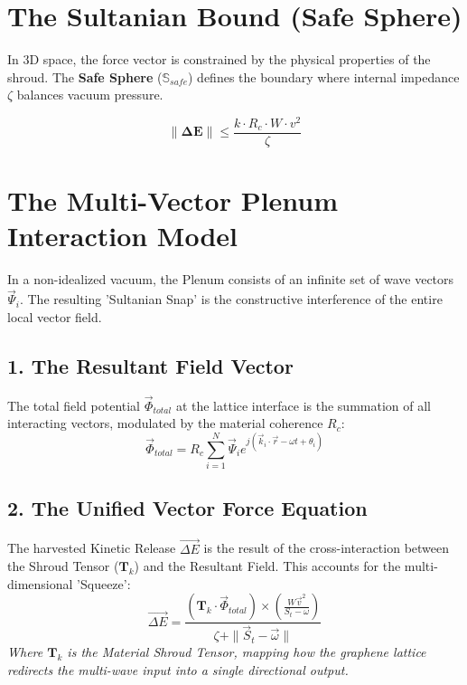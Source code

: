 \documentclass[11pt]{article}
\begin{document}
\section{The Sultanian Bound (Safe Sphere)}
In 3D space, the force vector is constrained by the physical properties of the shroud. The \textbf{Safe Sphere} ($\mathbb{S}_{safe}$) defines the boundary where internal impedance $\zeta$ balances vacuum pressure.

\begin{equation}
    \|\mathbf{\Delta E}\| \leq \frac{k \cdot R_c \cdot W \cdot v^2}{\zeta}
\end{equation}


\section*{The Multi-Vector Plenum Interaction Model}

In a non-idealized vacuum, the Plenum consists of an infinite set of wave vectors $\vec{\Psi}_i$. The resulting 'Sultanian Snap' is the constructive interference of the entire local vector field.

\subsection*{1. The Resultant Field Vector}
The total field potential $\vec{\Phi}_{total}$ at the lattice interface is the summation of all interacting vectors, modulated by the material coherence $R_c$:
\begin{equation}
    \vec{\Phi}_{total} = R_c \sum_{i=1}^{N} \vec{\Psi}_i e^{j(\vec{k}_i \cdot \vec{r} - \omega t + \theta_i)}
\end{equation}

\subsection*{2. The Unified Vector Force Equation}
The harvested Kinetic Release $\vec{\Delta E}$ is the result of the cross-interaction between the Shroud Tensor ($\mathbf{T}_k$) and the Resultant Field. This accounts for the multi-dimensional 'Squeeze':
\begin{equation}
    \vec{\Delta E} = \frac{\left( \mathbf{T}_k \cdot \vec{\Phi}_{total} \right) \times \left( \frac{W \vec{v}^2}{S_t - \omega} \right)}{\zeta + \| \vec{S}_t - \vec{\omega} \|}
\end{equation}
\textit{Where $\mathbf{T}_k$ is the Material Shroud Tensor, mapping how the graphene lattice redirects the multi-wave input into a single directional output.}
\end{document}
